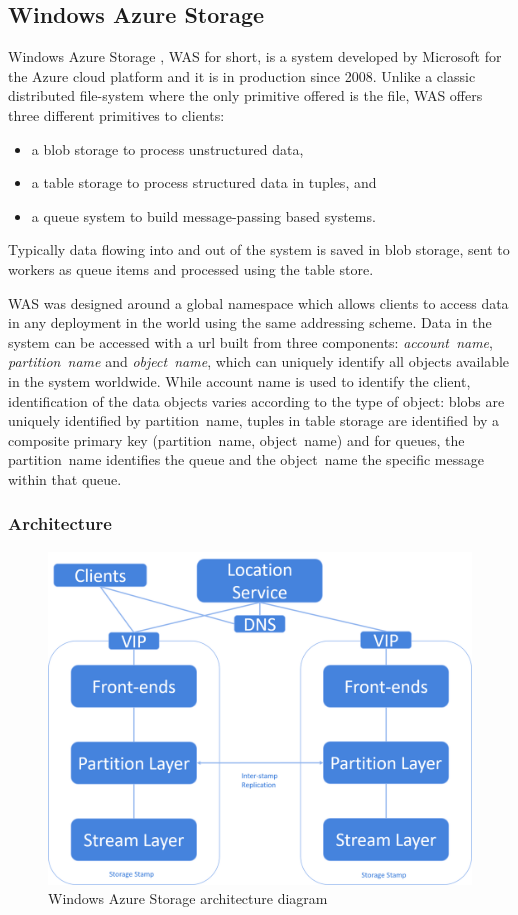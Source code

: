 \subsection{Windows Azure Storage}
Windows Azure Storage \cite{DBLP:conf/sosp/CalderWONSMXSWSHUKEBMAAHHBDAMSMR11}, WAS for short, is a system developed by Microsoft for the Azure cloud platform and it is in production since 2008.
Unlike a classic distributed file-system where the only primitive offered is the file, WAS offers three different primitives to clients:
\begin{itemize}
    \item a blob storage to process unstructured data,
    \item a table storage to process structured data in tuples, and
    \item a queue system to build message-passing based systems.
\end{itemize}
Typically data flowing into and out of the system is saved in blob storage, sent to workers as queue items and processed using the table store.

WAS was designed around a global namespace which allows clients to access data in any deployment in the world using the same addressing scheme.
Data in the system can be accessed with a url built from three components: \emph{account~name}, \emph{partition~name} and \emph{object~name}, which can uniquely identify all objects available in the system worldwide.
While account name is used to identify the client, identification of the data objects varies according to the type of object: blobs are uniquely identified by partition~name, tuples in table storage are identified by a composite primary key (partition~name, object~name) and for queues, the partition~name identifies the queue and the object~name the specific message within that queue.

\subsubsection{Architecture}
\begin{figure}[h]
\caption{Windows Azure Storage architecture diagram}
\label{fig:was-architecture}
\centering
\includegraphics[width=1.0\textwidth]{images/windows-azure-storage.png}
\end{figure}

